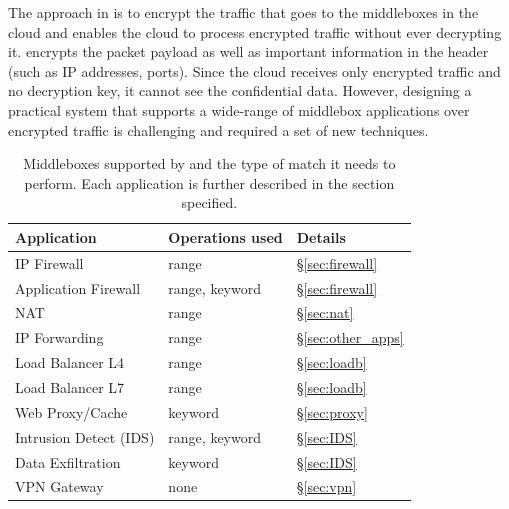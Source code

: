     The approach in \sys is to encrypt the traffic that goes to  the middleboxes in the cloud and enables the cloud to process encrypted traffic without ever decrypting it. \sys encrypts the packet payload as well as important information in the header (such as IP addresses, ports). Since the cloud receives only encrypted traffic and no decryption key, it cannot see the confidential data. However, designing a practical system that supports a wide-range of middlebox applications over encrypted traffic is challenging and required a set of new techniques.
    
    
    
    
\begin{table}[t!]
\centering
\begin{tabular}{p{3.2cm}|p{2.9cm}|p{1cm}}
{\bf Application}  & {\bf Operations used} & {\bf Details} \\
\hline \hline
IP Firewall &   range  & \S\ref{sec:firewall} \\
Application Firewall & range, keyword  & \S\ref{sec:firewall}\\
NAT & range  & \S\ref{sec:nat} \\
IP Forwarding  & range & \S\ref{sec:other_apps} \\
Load Balancer L4 & range & \S\ref{sec:loadb}\\
Load Balancer L7  & range & \S\ref{sec:loadb}\\
Web Proxy/Cache  & keyword & \S\ref{sec:proxy}\\
Intrusion Detect (IDS)  & range, keyword & \S\ref{sec:IDS}\\
Data Exfiltration  & keyword & \S\ref{sec:IDS} \\
VPN Gateway &  none & \S\ref{sec:vpn} \\ 
\end{tabular}
\caption{Middleboxes supported by \sys and the type of match it needs to perform. Each application is further described in the section specified. \label{tab:apps-ops} }
\end{table}

